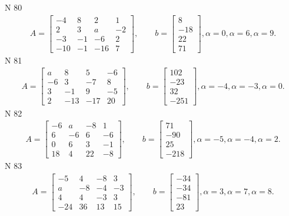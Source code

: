 \documentclass[11pt]{report}
\begin{document}
N 80
\begin{align*}
 A = \left[\begin{matrix}-4 & 8 & 2 & 1\\2 & 3 & a & -2\\-3 & -1 & -6 & 2\\-10 & -1 & -16 & 7\end{matrix}\right],
    \qquad b = \left[\begin{matrix}8\\-18\\22\\71\end{matrix}\right], \alpha = 0, \alpha = 6, \alpha = 9. 
 \end{align*}
N 81
\begin{align*}
 A = \left[\begin{matrix}a & 8 & 5 & -6\\-6 & 3 & -7 & 8\\3 & -1 & 9 & -5\\2 & -13 & -17 & 20\end{matrix}\right],
    \qquad b = \left[\begin{matrix}102\\-23\\32\\-251\end{matrix}\right], \alpha = -4, \alpha = -3, \alpha = 0. 
 \end{align*}
N 82
\begin{align*}
 A = \left[\begin{matrix}-6 & a & -8 & 1\\6 & -6 & 6 & -6\\0 & 6 & 3 & -1\\18 & 4 & 22 & -8\end{matrix}\right],
    \qquad b = \left[\begin{matrix}71\\-90\\25\\-218\end{matrix}\right], \alpha = -5, \alpha = -4, \alpha = 2. 
 \end{align*}
N 83
\begin{align*}
 A = \left[\begin{matrix}-5 & 4 & -8 & 3\\a & -8 & -4 & -3\\4 & 4 & -3 & 3\\-24 & 36 & 13 & 15\end{matrix}\right],
    \qquad b = \left[\begin{matrix}-34\\-34\\-81\\23\end{matrix}\right], \alpha = 3, \alpha = 7, \alpha = 8. 
 \end{align*}
\end{document}
